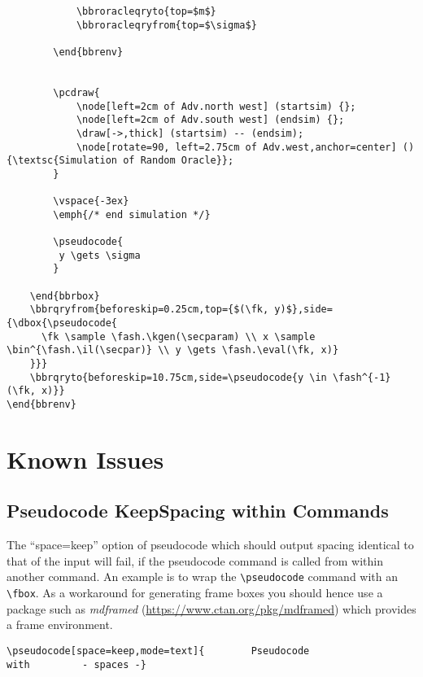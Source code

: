 \documentclass[a4paper]{report}
\begin{document}
\begin{lstlisting}
			\bbroracleqryto{top=$m$}
			\bbroracleqryfrom{top=$\sigma$}

		\end{bbrenv}


		\pcdraw{
			\node[left=2cm of Adv.north west] (startsim) {};
			\node[left=2cm of Adv.south west] (endsim) {};
			\draw[->,thick] (startsim) -- (endsim);
			\node[rotate=90, left=2.75cm of Adv.west,anchor=center] () {\textsc{Simulation of Random Oracle}};
		}

		\vspace{-3ex}
		\emph{/* end simulation */}

		\pseudocode{
		 y \gets \sigma
		}

	\end{bbrbox}
	\bbrqryfrom{beforeskip=0.25cm,top={$(\fk, y)$},side={\dbox{\pseudocode{
	  \fk \sample \fash.\kgen(\secparam) \\ x \sample \bin^{\fash.\il(\secpar)} \\ y \gets \fash.\eval(\fk, x)}
	}}}
	\bbrqryto{beforeskip=10.75cm,side=\pseudocode{y \in \fash^{-1}(\fk, x)}}
\end{bbrenv}
\end{lstlisting}


\chapter{Known Issues}

\section{Pseudocode KeepSpacing within Commands}
\label{sec:keepindent-problem}
The \enquote{space=keep} option of pseudocode which should output spacing identical to that of the input
will fail, if the pseudocode command is called from within another command. An example is to
wrap the \lstinline$\pseudocode$ command with an \lstinline$\fbox$. As a workaround for generating frame boxes you should hence
use a package such as \emph{mdframed} (\url{https://www.ctan.org/pkg/mdframed}) which provides a frame environment.

\begin{mdframed}
\end{mdframed}
\begin{lstlisting}
\pseudocode[space=keep,mode=text]{        Pseudocode                with         - spaces -}
\end{lstlisting}
\end{document}
